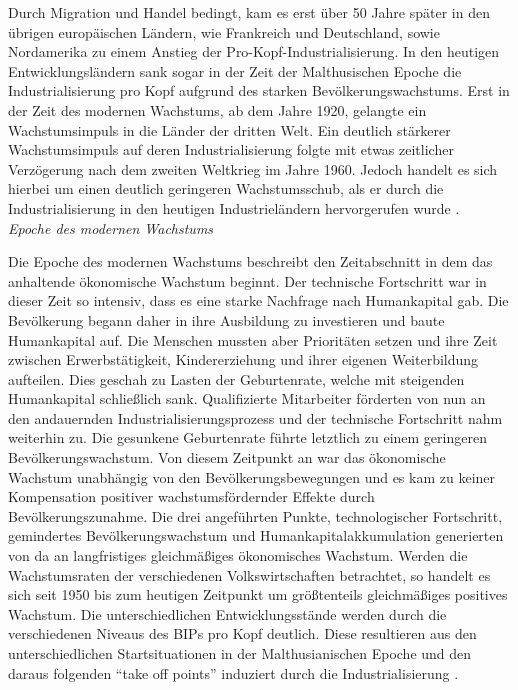 Durch Migration und Handel bedingt, kam es erst {\"u}ber 50 Jahre sp{\"a}ter in den {\"u}brigen europ{\"a}ischen L{\"a}ndern, wie Frankreich und Deutschland, sowie Nordamerika zu einem Anstieg der Pro-Kopf-Industrialisierung.  In den heutigen Entwicklungsl{\"a}ndern sank sogar in der Zeit der Malthusischen Epoche die Industrialisierung pro Kopf aufgrund des starken Bev{\"o}lkerungswachstums. Erst in der Zeit des modernen Wachstums, ab dem Jahre 1920, gelangte ein Wachstumsimpuls in die L{\"a}nder der dritten Welt. Ein deutlich st{\"a}rkerer Wachstumsimpuls auf deren Industrialisierung folgte mit etwas zeitlicher Verz{\"o}gerung nach dem zweiten Weltkrieg im Jahre 1960. Jedoch handelt es sich hierbei um einen deutlich geringeren Wachstumsschub, als er durch die Industrialisierung in den heutigen Industrieländern hervorgerufen wurde \citep{Galor.2014}.\\


\textit{Epoche des modernen Wachstums}\newline


Die Epoche des modernen Wachstums beschreibt den Zeitabschnitt in dem das anhaltende {\"o}konomische Wachstum beginnt. Der technische Fortschritt war in dieser Zeit so intensiv, dass es eine starke Nachfrage nach Humankapital gab. Die Bev{\"o}lkerung begann daher in ihre Ausbildung zu investieren und baute Humankapital auf. Die Menschen mussten aber Priorit{\"a}ten setzen und ihre Zeit zwischen Erwerbst{\"a}tigkeit, Kindererziehung und ihrer eigenen Weiterbildung aufteilen. Dies geschah zu Lasten der Geburtenrate, welche mit steigenden Humankapital schlie{\ss}lich sank. Qualifizierte Mitarbeiter f{\"o}rderten von nun an den andauernden Industrialisierungsprozess und der technische Fortschritt nahm weiterhin zu. Die gesunkene Geburtenrate f{\"u}hrte letztlich zu einem geringeren Bev{\"o}lkerungswachstum. Von diesem Zeitpunkt an war das {\"o}konomische Wachstum unabh{\"a}ngig von den Bev{\"o}lkerungsbewegungen und es kam zu keiner Kompensation positiver wachstumsf{\"o}rdernder Effekte durch Bev{\"o}lkerungszunahme. Die drei angef{\"u}hrten Punkte, technologischer Fortschritt, gemindertes Bev{\"o}lkerungswachstum und Humankapitalakkumulation generierten von da an langfristiges gleichm{\"a}{\ss}iges {\"o}konomisches Wachstum. \newline Werden die Wachstumsraten der verschiedenen Volkswirtschaften betrachtet, so handelt es sich seit 1950 bis zum heutigen Zeitpunkt um gr{\"o}{\ss}tenteils gleichm{\"a}{\ss}iges positives Wachstum. Die unterschiedlichen Entwicklungsst{\"a}nde werden durch die verschiedenen Niveaus des BIPs pro Kopf deutlich. Diese resultieren aus den unterschiedlichen Startsituationen in der Malthusianischen Epoche und den daraus folgenden "`take off points"' induziert durch die Industrialisierung \citep{Galor.2014}.\\


